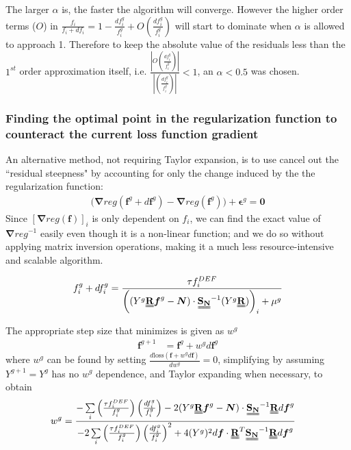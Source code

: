 \documentclass[a4paper, 12pt]{article}
\newcommand{\matr}[1]{\uuline{\bf{#1}}}
\newcommand{\ve}[1]{\boldsymbol{#1}}
\newcommand{\covarN}{\matr{S_N}^{-1}}
\newcommand{\tff}{\left(\frac{\tau f^{DEF}_i}{f^{g}_i}\right)}
\newcommand{\dff}{\left(\frac{d f^{g}_i}{f^{g}_i}\right)}
\newcommand{\RSR}{\matr{R}^T\covarN\matr{R}}
\begin{document}
The larger $\alpha$ is, the faster the algorithm will converge. However the higher order terms ($O$) in $\frac{f_i}{f_i+df_i} = 1- \frac{df^g_i}{f^g_i}+O\left(\frac{df^g_i}{f^g_i}\right)$ will start to dominate when $\alpha$ is allowed to approach 1. Therefore to keep the absolute value of the residuals less than the $1^{st}$ order approximation itself, i.e. $\frac{\left|O\left(\frac{df^g_i}{f^g_i}\right)\right|}{\left|\left(\frac{df^g_i}{f^g_i}\right)\right|}<1$, an $\alpha<0.5$ was chosen.


\subsubsection{Finding the optimal point in the regularization function to counteract the current loss function gradient}\label{simple iterative}
An alternative method, not requiring Taylor expansion, is to use cancel out the ``residual steepness" by accounting for only the change induced by the the regularization function:
\begin{align}
    \bigg(\ve{\nabla} reg(\ve{f}^g + d\ve{f}^g) - \ve{\nabla} reg(\ve{f}^g)\bigg) + \ve{\epsilon}^g = \ve{0}
\end{align}
Since $[\ve{\nabla}reg(\ve{f})]_i$ is only dependent on $f_i$, we can find the exact value of $\ve{\nabla}reg^{-1}$ easily even though it is a non-linear function; and we do so without applying matrix inversion operations, making it a much less resource-intensive and scalable algorithm.

\begin{align}
    f^g_i + df^g_i = \frac{\tau f^{DEF}_i}{\left((Y^g \matr{R}\ve{f}^g-\ve{N})\cdot\covarN (Y^g \matr{R})\right)_i + \mu^g}\label{direct iteration equation}
\end{align}

The appropriate step size that minimizes is given as $w^g$
\begin{align*}
    \ve{f}^{g+1}&= \ve{f}^g + w^g d\ve{f}^g
\end{align*}
where $w^g$ can be found by setting $\frac {d \text{loss}(\ve{f}+w^g d\ve{f})}{d w^g}=0$, simplifying by assuming $Y^{g+1}=Y^g$ has no $w^g$ dependence, and Taylor expanding when necessary, to obtain
\begin{align*}
    w^g &= \frac{
    - \sum\limits_i \tff \dff -2(Y^g\matr{R}\ve{f}^g- \ve{N})\cdot \covarN \matr{R} d\ve{f}^g
    }{
    -2\sum\limits_i \tff \dff^2 + 4 (Y^g)^2 d\ve{f}\cdot \RSR d\ve{f}^g
    }
\end{align*}
\end{document}
